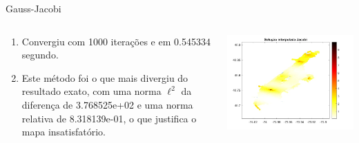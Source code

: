 \documentclass{beamer} %
\theoremstyle{definition}
\begin{document}
    \begin{frame}{Gauss-Jacobi}
        \pause
        \begin{columns}
            \begin{column}{0.5\textwidth}
               \begin{enumerate}
                   \item Convergiu com 1000 iterações e em 0.545334 segundo.
                    \pause
                    \item Este método foi o que mais divergiu do resultado exato, com uma norma $\ell^2$ da diferença de 3.768525e+02 e uma norma relativa de 8.318139e-01, o que justifica o mapa insatisfatório.
               \end{enumerate} 
            \end{column}
            \begin{column}{0.5\textwidth}
                \centering
                \includegraphics[width=\textwidth]{GJinterpol.jpeg}
            \end{column}
        \end{columns}
    \end{frame}
\end{document}
